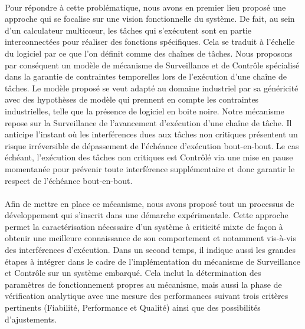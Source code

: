 \documentclass[a4paper,11pt,twoside]{StyleThese}
\begin{document}
\paragraph*{} Pour répondre à cette problématique, nous avons en premier lieu proposé une approche qui se focalise sur une vision fonctionnelle du système. De fait, au sein d'un calculateur multicœur, les tâches qui s'exécutent sont en partie interconnectées pour réaliser des fonctions spécifiques. Cela se traduit à l'échelle du logiciel par ce que l'on définit comme des chaînes de tâches. Nous proposons par conséquent un modèle de mécanisme de Surveillance et de Contrôle spécialisé dans la garantie de contraintes temporelles lors de l'exécution d'une chaîne de tâches. Le modèle proposé se veut adapté au domaine industriel par sa généricité avec des hypothèses de modèle qui prennent en compte les contraintes industrielles, telle que la présence de logiciel en boite noire.
Notre mécanisme repose sur la Surveillance de l'avancement d'exécution d'une chaîne de tâche. Il anticipe l'instant où les interférences dues aux tâches non critiques présentent un risque irréversible de dépassement de l'échéance d'exécution bout-en-bout. Le cas échéant, l'exécution des tâches non critiques est Contrôlé via une mise en pause momentanée pour prévenir toute interférence supplémentaire et donc garantir le respect de l'échéance bout-en-bout.

\paragraph*{} Afin de mettre en place ce mécanisme, nous avons proposé tout un processus de développement qui s'inscrit dans une démarche expérimentale. Cette approche permet la caractérisation nécessaire d'un système à criticité mixte de façon à obtenir une meilleure connaissance de son comportement et notamment vis-à-vis des interférences d'exécution. Dans un second temps, il indique aussi les grandes étapes à intégrer dans le cadre de l'implémentation du mécanisme de Surveillance et Contrôle sur un système embarqué. Cela inclut la détermination des paramètres de fonctionnement propres au mécanisme, mais aussi la phase de vérification analytique avec une mesure des performances suivant trois critères pertinents (Fiabilité, Performance et Qualité) ainsi que des possibilités d'ajustements.
\end{document}
